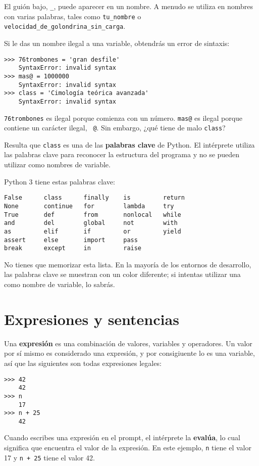 \documentclass[10pt]{book}
\begin{document}
El guión bajo, \verb"_", puede aparecer en un nombre.
A menudo se utiliza en nombres con varias palabras, tales como
\verb"tu_nombre" o \verb"velocidad_de_golondrina_sin_carga".

Si le das un nombre ilegal a una variable, obtendrás un error de sintaxis:

\begin{verbatim}
>>> 76trombones = 'gran desfile'
    SyntaxError: invalid syntax
>>> mas@ = 1000000
    SyntaxError: invalid syntax
>>> class = 'Cimología teórica avanzada'
    SyntaxError: invalid syntax
\end{verbatim}
%
{\tt 76trombones} es ilegal porque comienza con un número.
{\tt mas@} es ilegal porque contiene un carácter ilegal, {\tt
@}.  Sin embargo, ¿qué tiene de malo {\tt class}?

Resulta que {\tt class} es una de las {\bf palabras clave} de Python.  El
intérprete utiliza las palabras clave para reconocer la estructura del programa
y no se pueden utilizar como nombres de variable.

Python 3 tiene estas palabras clave:

\begin{verbatim}
False      class      finally    is         return
None       continue   for        lambda     try
True       def        from       nonlocal   while
and        del        global     not        with
as         elif       if         or         yield
assert     else       import     pass
break      except     in         raise
\end{verbatim}
%
No tienes que memorizar esta lista.  En la mayoría de los entornos de desarrollo,
las palabras clave se muestran con un color diferente; si intentas utilizar una
como nombre de variable, lo sabrás.


\section{Expresiones y sentencias}

Una {\bf expresión} es una combinación de valores, variables y operadores.
Un valor por sí mismo es considerado una expresión, y por consigiuente lo es
una variable, así que las siguientes son todas expresiones legales:

\begin{verbatim}
>>> 42
    42
>>> n
    17
>>> n + 25
    42
\end{verbatim}
%
Cuando escribes una expresión en el prompt, el intérprete
la {\bf evalúa}, lo cual significa que encuentra el valor de
la expresión.
En este ejemplo, {\tt n} tiene el valor 17 y
{\tt n + 25} tiene el valor 42.
\end{document}
